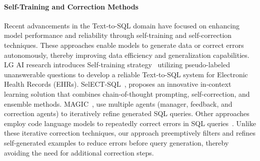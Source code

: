 \paragraph{Self-Training and Correction Methods}
Recent advancements in the Text-to-SQL domain have focused on enhancing model performance and reliability through self-training and self-correction techniques. These approaches enable models to generate data or correct errors autonomously, thereby improving data efficiency and generalization capabilities. LG AI research introduces Self-training strategy~\cite{lghealth_self} utilizing pseudo-labeled unanswerable questions to develop a reliable Text-to-SQL system for Electronic Health Records (EHRs). SelECT-SQL~\cite{self_correct}, proposes an innovative in-context learning solution that combines chain-of-thought prompting, self-correction, and ensemble methods. MAGIC~\cite{magic}, use multiple agents (manager, feedback, and correction agents) to iteratively refine generated SQL queries. Other approaches employ code language models to repeatedly correct errors in SQL queries~\cite{self_error_correct}. Unlike these iterative correction techniques, our approach preemptively filters and refines self-generated examples to reduce errors before query generation, thereby avoiding the need for additional correction steps.